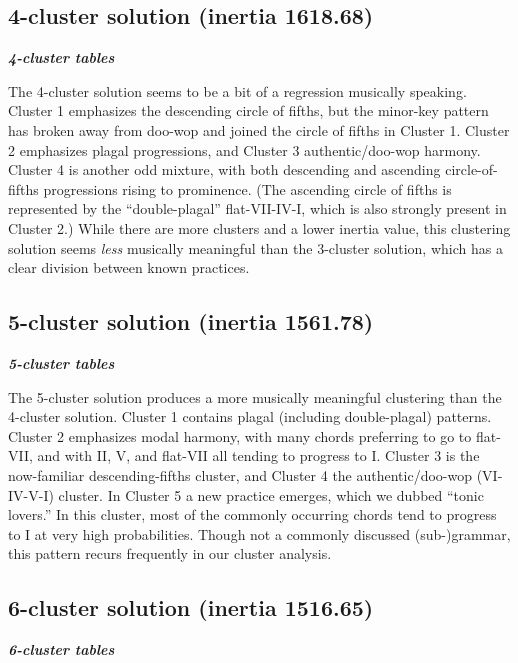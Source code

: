 \subsection{4-cluster solution (inertia 1618.68)}
\label{4-clustersolutioninertia1618.68}

\textbf{\emph{4-cluster tables}}

The 4-cluster solution seems to be a bit of a regression musically speaking. Cluster 1 emphasizes the descending circle of fifths, but the minor-key pattern has broken away from doo-wop and joined the circle of fifths in Cluster 1. Cluster 2 emphasizes plagal progressions, and Cluster 3 authentic\slash doo-wop harmony. Cluster 4 is another odd mixture, with both descending and ascending circle-of-fifths progressions rising to prominence. (The ascending circle of fifths is represented by the ``double-plagal'' flat-VII-IV-I, which is also strongly present in Cluster 2.) While there are more clusters and a lower inertia value, this clustering solution seems \emph{less} musically meaningful than the 3-cluster solution, which has a clear division between known practices.

\subsection{5-cluster solution (inertia 1561.78)}
\label{5-clustersolutioninertia1561.78}

\textbf{\emph{5-cluster tables}}

The 5-cluster solution produces a more musically meaningful clustering than the 4-cluster solution. Cluster 1 contains plagal (including double-plagal) patterns. Cluster 2 emphasizes modal harmony, with many chords preferring to go to flat-VII, and with II, V, and flat-VII all tending to progress to I. Cluster 3 is the now-familiar descending-fifths cluster, and Cluster 4 the authentic\slash doo-wop (VI-IV-V-I) cluster. In Cluster 5 a new practice emerges, which we dubbed ``tonic lovers.'' In this cluster, most of the commonly occurring chords tend to progress to I at very high probabilities. Though not a commonly discussed (sub-)grammar, this pattern recurs frequently in our cluster analysis.

\subsection{6-cluster solution (inertia 1516.65)}
\label{6-clustersolutioninertia1516.65}

\textbf{\emph{6-cluster tables}}

